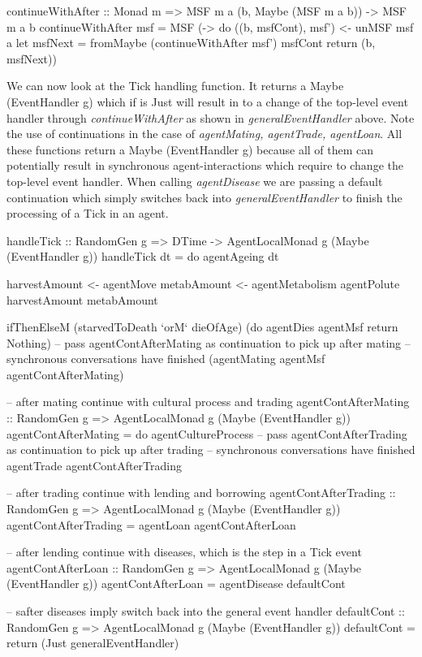 \begin{HaskellCode}
continueWithAfter :: Monad m => MSF m a (b, Maybe (MSF m a b)) -> MSF m a b
continueWithAfter msf = MSF (\a -> do
  ((b, msfCont), msf') <- unMSF msf a
  let msfNext = fromMaybe (continueWithAfter msf') msfCont
  return (b, msfNext))
\end{HaskellCode}

We can now look at the Tick handling function. It returns a Maybe (EventHandler g) which if is Just will result in to a change of the top-level event handler through \textit{continueWithAfter} as shown in \textit{generalEventHandler} above. Note the use of continuations in the case of \textit{agentMating, agentTrade, agentLoan}. All these functions return a Maybe (EventHandler g) because all of them can potentially result in synchronous agent-interactions which require to change the top-level event handler. When calling \textit{agentDisease} we are passing a default continuation which simply switches back into \textit{generalEventHandler} to finish the processing of a Tick in an agent.

\begin{HaskellCode}
handleTick :: RandomGen g => DTime -> AgentLocalMonad g (Maybe (EventHandler g))
handleTick dt = do
  agentAgeing dt
  
  harvestAmount <- agentMove
  metabAmount   <- agentMetabolism
  agentPolute harvestAmount metabAmount

  ifThenElseM
    (starvedToDeath `orM` dieOfAge)
    (do
      agentDies agentMsf
      return Nothing) 
    -- pass agentContAfterMating as continuation to pick up after mating
    -- synchronous conversations have finished
    (agentMating agentMsf agentContAfterMating)

-- after mating continue with cultural process and trading
agentContAfterMating :: RandomGen g => AgentLocalMonad g (Maybe (EventHandler g))
agentContAfterMating = do
    agentCultureProcess
    -- pass agentContAfterTrading as continuation to pick up after trading 
    -- synchronous conversations have finished
    agentTrade agentContAfterTrading 

-- after trading continue with lending and borrowing
agentContAfterTrading :: RandomGen g  => AgentLocalMonad g (Maybe (EventHandler g))
agentContAfterTrading = agentLoan agentContAfterLoan

-- after lending continue with diseases, which is the step in a Tick event
agentContAfterLoan :: RandomGen g => AgentLocalMonad g (Maybe (EventHandler g))
agentContAfterLoan = agentDisease defaultCont

-- safter diseases imply switch back into the general event handler
defaultCont :: RandomGen g => AgentLocalMonad g (Maybe (EventHandler g))
defaultCont = return (Just generalEventHandler)
\end{HaskellCode}

